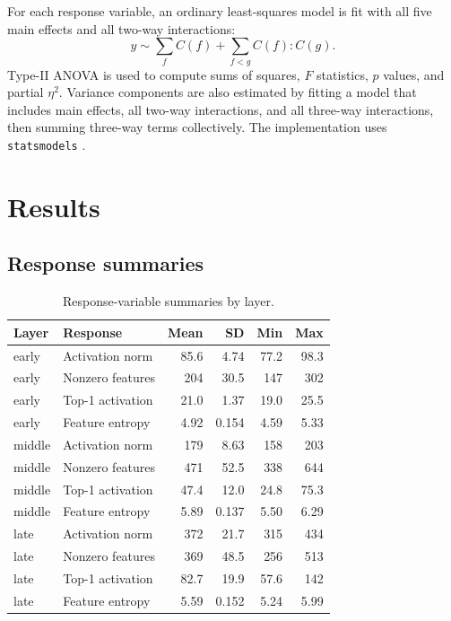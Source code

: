 \documentclass[11pt]{article}
\begin{document}
For each response variable, an ordinary least-squares model is fit with all five main effects and all two-way interactions:
\[
y \sim \sum_f C(f) + \sum_{f < g} C(f):C(g).
\]
Type-II ANOVA is used to compute sums of squares, $F$ statistics, $p$ values, and partial $\eta^2$. Variance components are also estimated by fitting a model that includes main effects, all two-way interactions, and all three-way interactions, then summing three-way terms collectively. The implementation uses \texttt{statsmodels} \citep{seabold2010statsmodels}.

\section{Results}

\subsection{Response summaries}

\begin{table}[ht]
\centering
\caption{Response-variable summaries by layer.}
\label{tab:response-summary}
\begin{tabular}{llrrrr}
\toprule
Layer & Response & Mean & SD & Min & Max \\
\midrule
early & Activation norm & 85.6 & 4.74 & 77.2 & 98.3 \\
early & Nonzero features & 204 & 30.5 & 147 & 302 \\
early & Top-1 activation & 21.0 & 1.37 & 19.0 & 25.5 \\
early & Feature entropy & 4.92 & 0.154 & 4.59 & 5.33 \\
middle & Activation norm & 179 & 8.63 & 158 & 203 \\
middle & Nonzero features & 471 & 52.5 & 338 & 644 \\
middle & Top-1 activation & 47.4 & 12.0 & 24.8 & 75.3 \\
middle & Feature entropy & 5.89 & 0.137 & 5.50 & 6.29 \\
late & Activation norm & 372 & 21.7 & 315 & 434 \\
late & Nonzero features & 369 & 48.5 & 256 & 513 \\
late & Top-1 activation & 82.7 & 19.9 & 57.6 & 142 \\
late & Feature entropy & 5.59 & 0.152 & 5.24 & 5.99 \\
\bottomrule
\end{tabular}
\end{table}
\end{document}
